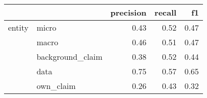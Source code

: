 \begin{tabular}{llrrr}
\toprule
       &           &  precision &  recall &   f1 \\
\midrule
entity & micro &       0.43 &    0.52 & 0.47 \\
       & macro &       0.46 &    0.51 & 0.47 \\
       & background\_claim &       0.38 &    0.52 & 0.44 \\
       & data &       0.75 &    0.57 & 0.65 \\
       & own\_claim &       0.26 &    0.43 & 0.32 \\
\bottomrule
\end{tabular}
